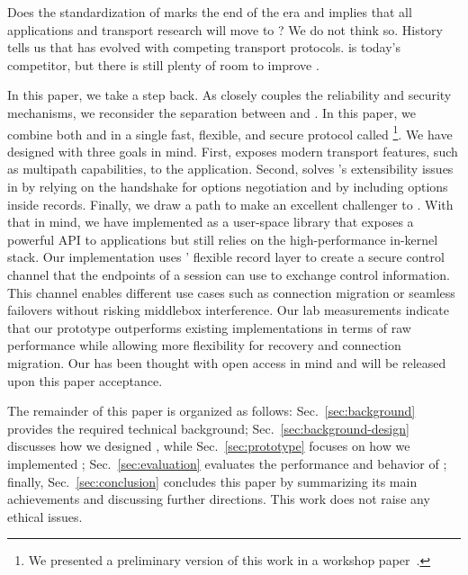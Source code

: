 Does the standardization of \quic marks the end of the \tcp era and implies that
all applications and transport research will move to \quic?  We do not think
so. History tells us that \tcp has evolved with competing transport protocols.
\quic is today's competitor, but there is still plenty of room to improve \tcp.

In this paper, we take a step back. As \quic closely couples the reliability and
security mechanisms, we reconsider the separation between \tcp and \tls.  In
this paper, we combine both \tcp and  in a single fast, flexible, and
secure protocol called \textbf{\tcpls}\footnote{We presented a preliminary version of this
work in a workshop paper~\cite{rochet2020tcpls}.}. We have
designed \tcpls with three goals in mind. First, \tcpls exposes modern transport
features, such as multipath capabilities, to the application. Second, \tcpls
solves \tcp's extensibility issues in \tcp by relying on the \tls handshake for
\tcp options negotiation and by including \tcp options inside \tls records.
Finally, we draw a path to make \tcpls an excellent challenger to \quic.  With that in
mind, we have implemented \tcpls as a user-space library that exposes a powerful
API to applications but still relies on the high-performance in-kernel \tcp
stack. Our implementation uses \tls' flexible record layer to create a secure
control channel that the endpoints of a \tcpls session can use to exchange
control information. This channel enables different use cases such as connection
migration or seamless failovers without risking middlebox interference. Our lab
measurements indicate that our \tcpls prototype outperforms existing \quic
implementations in terms of raw performance while allowing more flexibility
for recovery and connection migration. Our \tcpls has been thought
with open access in mind and will be released upon this paper acceptance.

The remainder of this paper is organized as follows: Sec.~\ref{sec:background}
provides the required technical background; Sec.~\ref{sec:background-design}
discusses how we designed \tcpls, while Sec.~\ref{sec:prototype} focuses on how
we implemented \tcpls; Sec.~\ref{sec:evaluation} evaluates the performance and
behavior of \tcpls;  finally, Sec.~\ref{sec:conclusion} concludes this paper by
summarizing its main achievements and discussing further directions.  This work
does not raise any ethical issues.

